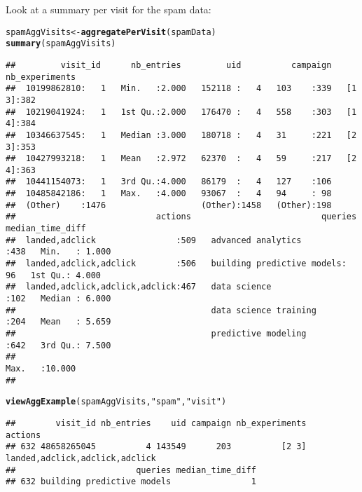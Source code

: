 \documentclass{article}\usepackage[]{graphicx}\usepackage[]{color}
\makeatletter
\newcommand{\hlstr}[1]{\textcolor[rgb]{0.192,0.494,0.8}{#1}}%
\newcommand{\hlstd}[1]{\textcolor[rgb]{0.345,0.345,0.345}{#1}}%
\newcommand{\hlkwb}[1]{\textcolor[rgb]{0.69,0.353,0.396}{#1}}%
\newcommand{\hlkwd}[1]{\textcolor[rgb]{0.737,0.353,0.396}{\textbf{#1}}}%
\newenvironment{kframe}{%
 \def\at@end@of@kframe{}%
 \ifinner\ifhmode%
  \def\at@end@of@kframe{\end{minipage}}%
  \begin{minipage}{\columnwidth}%
 \fi\fi%
 \def\FrameCommand##1{\hskip\@totalleftmargin \hskip-\fboxsep
 \colorbox{shadecolor}{##1}\hskip-\fboxsep
     \hskip-\linewidth \hskip-\@totalleftmargin \hskip\columnwidth}%
 \MakeFramed {\advance\hsize-\width
   \@totalleftmargin\z@ \linewidth\hsize
   \@setminipage}}%
 {\par\unskip\endMakeFramed%
 \at@end@of@kframe}
\newenvironment{knitrout}{}{} %
\makeatother
\begin{document}
Look at a summary per visit for the spam data:
\begin{knitrout}
\color{fgcolor}\begin{kframe}
\begin{alltt}
\hlstd{spamAggVisits} \hlkwb{<-} \hlkwd{aggregatePerVisit}\hlstd{(spamData)}
\hlkwd{summary}\hlstd{(spamAggVisits)}
\end{alltt}
\begin{verbatim}
##         visit_id      nb_entries         uid          campaign   nb_experiments
##  10199862810:   1   Min.   :2.000   152118 :   4   103    :339   [1 3]:382     
##  10219041924:   1   1st Qu.:2.000   176470 :   4   558    :303   [1 4]:384     
##  10346637545:   1   Median :3.000   180718 :   4   31     :221   [2 3]:353     
##  10427993218:   1   Mean   :2.972   62370  :   4   59     :217   [2 4]:363     
##  10441154073:   1   3rd Qu.:4.000   86179  :   4   127    :106                 
##  10485842186:   1   Max.   :4.000   93067  :   4   94     : 98                 
##  (Other)    :1476                   (Other):1458   (Other):198                 
##                            actions                          queries    median_time_diff
##  landed,adclick                :509   advanced analytics        :438   Min.   : 1.000  
##  landed,adclick,adclick        :506   building predictive models: 96   1st Qu.: 4.000  
##  landed,adclick,adclick,adclick:467   data science              :102   Median : 6.000  
##                                       data science training     :204   Mean   : 5.659  
##                                       predictive modeling       :642   3rd Qu.: 7.500  
##                                                                        Max.   :10.000  
## 
\end{verbatim}
\begin{alltt}
\hlkwd{viewAggExample}\hlstd{(spamAggVisits,} \hlstr{"spam"}\hlstd{,} \hlstr{"visit"}\hlstd{)}
\end{alltt}
\begin{verbatim}
##        visit_id nb_entries    uid campaign nb_experiments                        actions
## 632 48658265045          4 143549      203          [2 3] landed,adclick,adclick,adclick
##                        queries median_time_diff
## 632 building predictive models                1
\end{verbatim}
\end{kframe}
\end{knitrout}
\end{document}
